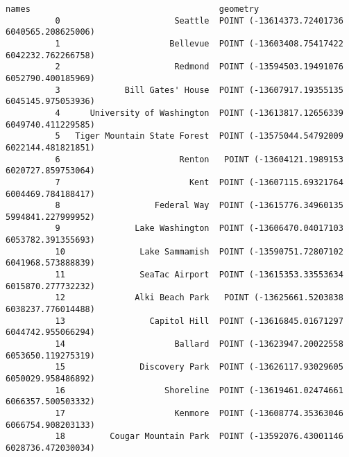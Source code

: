 \documentclass[11pt]{article}
\begin{document}
\begin{Verbatim}[commandchars=\\\{\}]
                                    names                                      geometry  
          0                       Seattle  POINT (-13614373.72401736 6040565.208625006)  
          1                      Bellevue  POINT (-13603408.75417422 6042232.762266758)  
          2                       Redmond  POINT (-13594503.19491076 6052790.400185969)  
          3             Bill Gates' House  POINT (-13607917.19355135 6045145.975053936)  
          4      University of Washington  POINT (-13613817.12656339 6049740.411229585)  
          5   Tiger Mountain State Forest  POINT (-13575044.54792009 6022144.481821851)  
          6                        Renton   POINT (-13604121.1989153 6020727.859753064)  
          7                          Kent  POINT (-13607115.69321764 6004469.784188417)  
          8                   Federal Way  POINT (-13615776.34960135 5994841.227999952)  
          9               Lake Washington  POINT (-13606470.04017103 6053782.391355693)  
          10               Lake Sammamish  POINT (-13590751.72807102 6041968.573888839)  
          11               SeaTac Airport  POINT (-13615353.33553634 6015870.277732232)  
          12              Alki Beach Park   POINT (-13625661.5203838 6038237.776014488)  
          13                 Capitol Hill  POINT (-13616845.01671297 6044742.955066294)  
          14                      Ballard  POINT (-13623947.20022558 6053650.119275319)  
          15               Discovery Park  POINT (-13626117.93029605 6050029.958486892)  
          16                    Shoreline  POINT (-13619461.02474661 6066357.500503332)  
          17                      Kenmore  POINT (-13608774.35363046 6066754.908203133)  
          18         Cougar Mountain Park  POINT (-13592076.43001146 6028736.472030034)  
\end{Verbatim}
            
\end{document}

